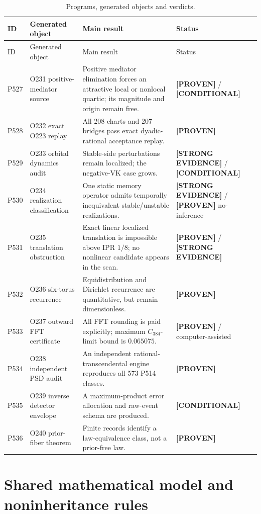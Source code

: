 \documentclass[11pt,a4paper]{article}
\newcommand{\proven}{\textcolor{green!50!black}{\textbf{[PROVEN]}}}
\newcommand{\strong}{\textcolor{blue!70!black}{\textbf{[STRONG EVIDENCE]}}}
\newcommand{\conditional}{\textcolor{black!60}{\textbf{[CONDITIONAL]}}}
\begin{document}
\begin{longtable}{@{}p{}p{}p{}p{}@{}}
\caption{Programs, generated objects and verdicts.}\\
\toprule
ID & Generated object & Main result & Status\\
\midrule
\endfirsthead
\toprule
ID & Generated object & Main result & Status\\
\midrule
\endhead
P527 & O231 positive-mediator source & Positive mediator elimination forces an attractive local or nonlocal quartic; its magnitude and origin remain free. & \proven{} / \conditional\\
P528 & O232 exact O223 replay & All 208 charts and 207 bridges pass exact dyadic-rational acceptance replay. & \proven\\
P529 & O233 orbital dynamics audit & Stable-side perturbations remain localized; the negative-VK case grows. & \strong{} / \conditional\\
P530 & O234 realization classification & One static memory operator admits temporally inequivalent stable/unstable realizations. & \strong{} / \proven{} no-inference\\
P531 & O235 translation obstruction & Exact linear localized translation is impossible above IPR $1/8$; no nonlinear candidate appears in the scan. & \proven{} / \strong\\
P532 & O236 six-torus recurrence & Equidistribution and Dirichlet recurrence are quantitative, but remain dimensionless. & \proven\\
P533 & O237 outward FFT certificate & All FFT rounding is paid explicitly; maximum $C_{384}$-limit bound is $0.065075$. & \proven{} / computer-assisted\\
P534 & O238 independent PSD audit & An independent rational-transcendental engine reproduces all 573 P514 classes. & \proven\\
P535 & O239 inverse detector envelope & A maximum-product error allocation and raw-event schema are produced. & \conditional\\
P536 & O240 prior-fiber theorem & Finite records identify a law-equivalence class, not a prior-free law. & \proven\\
\bottomrule
\end{longtable}

\section{Shared mathematical model and noninheritance rules}
\end{document}
